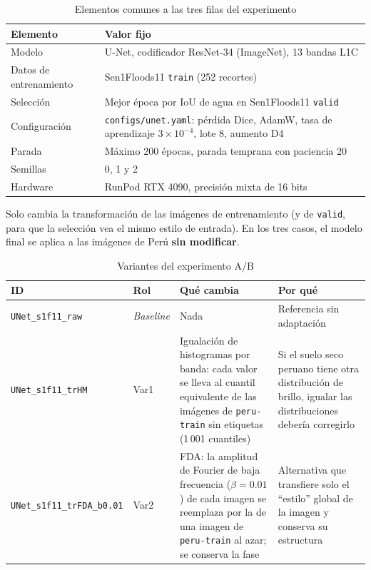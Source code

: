 \begin{table}[H]
    \centering
    \small
    \caption{Elementos comunes a las tres filas del experimento}
    \label{tab:sprint_fijo}
    \begin{tabular}{|p{4.0cm}|p{10.5cm}|}
        \hline
        \textbf{Elemento} & \textbf{Valor fijo} \\
        \hline
        Modelo & U-Net, codificador ResNet-34 (ImageNet), 13 bandas L1C \\
        \hline
        Datos de entrenamiento & Sen1Floods11 \texttt{train} (252 recortes) \\
        \hline
        Selección & Mejor época por IoU de agua en Sen1Floods11 \texttt{valid} \\
        \hline
        Configuración & \texttt{configs/\allowbreak{}unet.yaml}: pérdida Dice, AdamW, tasa de aprendizaje $3\times10^{-4}$, lote 8, aumento D4 \\
        \hline
        Parada & Máximo 200 épocas, parada temprana con paciencia 20 \\
        \hline
        Semillas & 0, 1 y 2 \\
        \hline
        Hardware & RunPod RTX 4090, precisión mixta de 16 bits \\
        \hline
    \end{tabular}
\end{table}

Solo cambia la transformación de las imágenes de entrenamiento (y de \texttt{valid}, para que la
selección vea el mismo estilo de entrada). En los tres casos, el modelo final se aplica a las
imágenes de Perú \textbf{sin modificar}.

\begin{table}[H]
    \centering
    \small
    \caption{Variantes del experimento A/B}
    \label{tab:sprint_variantes}
    \begin{tabular}{|p{3.3cm}|p{1.4cm}|p{5.2cm}|p{4.6cm}|}
        \hline
        \textbf{ID} & \textbf{Rol} & \textbf{Qué cambia} & \textbf{Por qué} \\
        \hline
        \texttt{UNet\_\allowbreak{}s1f11\_\allowbreak{}raw} & \textit{Baseline} & Nada & Referencia sin adaptación \\
        \hline
        \texttt{UNet\_\allowbreak{}s1f11\_\allowbreak{}trHM} & Var1 & Igualación de histogramas por banda: cada valor se lleva al cuantil equivalente de las imágenes de \texttt{peru-\allowbreak{}train} sin etiquetas (1\,001 cuantiles) & Si el suelo seco peruano tiene otra distribución de brillo, igualar las distribuciones debería corregirlo \\
        \hline
        \texttt{UNet\_\allowbreak{}s1f11\_\allowbreak{}trFDA\_\allowbreak{}b0.01} & Var2 & FDA: la amplitud de Fourier de baja frecuencia ($\beta = 0.01$) de cada imagen se reemplaza por la de una imagen de \texttt{peru-\allowbreak{}train} al azar; se conserva la fase & Alternativa que transfiere solo el ``estilo'' global de la imagen y conserva su estructura \\
        \hline
    \end{tabular}
\end{table}

